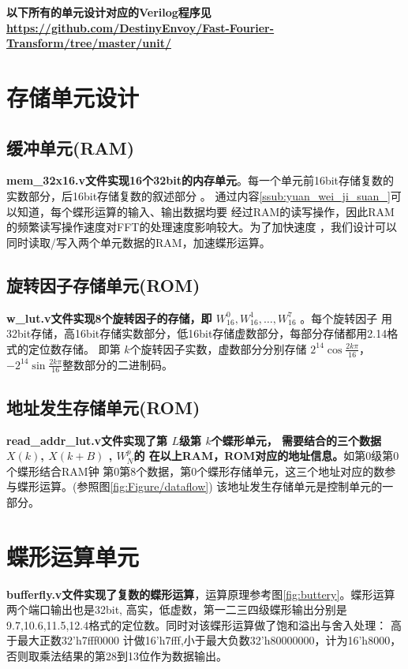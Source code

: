 \textbf{以下所有的单元设计对应的Verilog程序见 \url{https://github.com/DestinyEnvoy/Fast-Fourier-Transform/tree/master/unit/}}

\section{存储单元设计}

\subsection{缓冲单元(RAM)}
\textbf{{mem\_32x16.v}文件实现16个32bit的内存单元}。每一个单元前16bit存储复数的实数部分，后16bit存储复数的叙述部分 。
        通过内容\ref{ssub:yuan_wei_ji_suan_}可以知道，每个蝶形运算的输入、输出数据均要
        经过RAM的读写操作，因此RAM的频繁读写操作速度对FFT的处理速度影响较大。为了加快速度
        ，我们设计可以同时读取/写入两个单元数据的RAM，加速蝶形运算。
        \subsection{旋转因子存储单元(ROM)}

\textbf{w\_lut.v文件实现8个旋转因子的存储，即 $W_{16}^0,W_{16}^1,\dots,W_{16}^7$ }。每个旋转因子
用32bit存储，高16bit存储实数部分，低16bit存储虚数部分，每部分存储都用2.14格式的定位数存储。
即第 $k$个旋转因子实数，虚数部分分别存储 $2^{14}\cos{\frac{2k\pi}{16}}$，$-2^{14}\sin{\frac{2k\pi}{16}}$整数部分的二进制码。

\subsection{地址发生存储单元(ROM)}%
\label{sub:di_zhi_fa_sheng_cun_chu_dan_yuan_rom_}

\textbf{read\_addr\_lut.v文件实现了第 $L$级第  $k$个蝶形单元，
需要结合的三个数据  $X(k)$,  $X(k+B)$ , $W_N^p$的
在以上RAM，ROM对应的地址信息。}如第0级第0个蝶形结合RAM钟
第0第8个数据，第0个蝶形存储单元，这三个地址对应的数参与蝶形运算。(参照图\ref{fig:Figure/dataflow})
该地址发生存储单元是控制单元的一部分。

\section{蝶形运算单元}

\textbf{bufferfly.v文件实现了复数的蝶形运算}，运算原理参考图\ref{fig:buttery}。蝶形运算两个端口输出也是32bit,
高实，低虚数，第一二三四级蝶形输出分别是9.7,10.6,11.5,12.4格式的定位数。同时对该蝶形运算做了饱和溢出与舍入处理：
高于最大正数32'h7fff0000 计做16'h7fff,小于最大负数32'h80000000，计为16'h8000，
否则取乘法结果的第28到13位作为数据输出。
